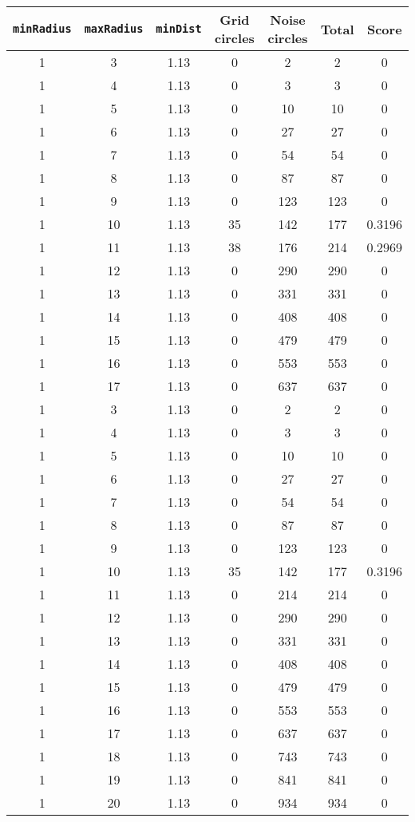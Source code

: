 \documentclass[letterpaper, 12pt]{article}
\begin{document}
\begin{longtable}{|c|c|c|c|c|c|c|}
\hline
\textbf{\texttt{minRadius}} & \textbf{\texttt{maxRadius}} & \textbf{\texttt{minDist}} & \textbf{Grid circles} & \textbf{Noise circles} & \textbf{Total} & \textbf{Score} \\
\hline
1 & 3 & 1.13 & 0 & 2 & 2 & 0 \\
\hline
1 & 4 & 1.13 & 0 & 3 & 3 & 0 \\
\hline
1 & 5 & 1.13 & 0 & 10 & 10 & 0 \\
\hline
1 & 6 & 1.13 & 0 & 27 & 27 & 0 \\
\hline
1 & 7 & 1.13 & 0 & 54 & 54 & 0 \\
\hline
1 & 8 & 1.13 & 0 & 87 & 87 & 0 \\
\hline
1 & 9 & 1.13 & 0 & 123 & 123 & 0 \\
\hline
1 & 10 & 1.13 & 35 & 142 & 177 & 0.3196 \\
\hline
1 & 11 & 1.13 & 38 & 176 & 214 & 0.2969 \\
\hline
1 & 12 & 1.13 & 0 & 290 & 290 & 0 \\
\hline
1 & 13 & 1.13 & 0 & 331 & 331 & 0 \\
\hline
1 & 14 & 1.13 & 0 & 408 & 408 & 0 \\
\hline
1 & 15 & 1.13 & 0 & 479 & 479 & 0 \\
\hline
1 & 16 & 1.13 & 0 & 553 & 553 & 0 \\
\hline
1 & 17 & 1.13 & 0 & 637 & 637 & 0 \\
\hline
1 & 3 & 1.13 & 0 & 2 & 2 & 0 \\
\hline
1 & 4 & 1.13 & 0 & 3 & 3 & 0 \\
\hline
1 & 5 & 1.13 & 0 & 10 & 10 & 0 \\
\hline
1 & 6 & 1.13 & 0 & 27 & 27 & 0 \\
\hline
1 & 7 & 1.13 & 0 & 54 & 54 & 0 \\
\hline
1 & 8 & 1.13 & 0 & 87 & 87 & 0 \\
\hline
1 & 9 & 1.13 & 0 & 123 & 123 & 0 \\
\hline
1 & 10 & 1.13 & 35 & 142 & 177 & 0.3196 \\
\hline
1 & 11 & 1.13 & 0 & 214 & 214 & 0 \\
\hline
1 & 12 & 1.13 & 0 & 290 & 290 & 0 \\
\hline
1 & 13 & 1.13 & 0 & 331 & 331 & 0 \\
\hline
1 & 14 & 1.13 & 0 & 408 & 408 & 0 \\
\hline
1 & 15 & 1.13 & 0 & 479 & 479 & 0 \\
\hline
1 & 16 & 1.13 & 0 & 553 & 553 & 0 \\
\hline
1 & 17 & 1.13 & 0 & 637 & 637 & 0 \\
\hline
1 & 18 & 1.13 & 0 & 743 & 743 & 0 \\
\hline
1 & 19 & 1.13 & 0 & 841 & 841 & 0 \\
\hline
1 & 20 & 1.13 & 0 & 934 & 934 & 0 \\
\hline
\end{longtable}
\end{document}

